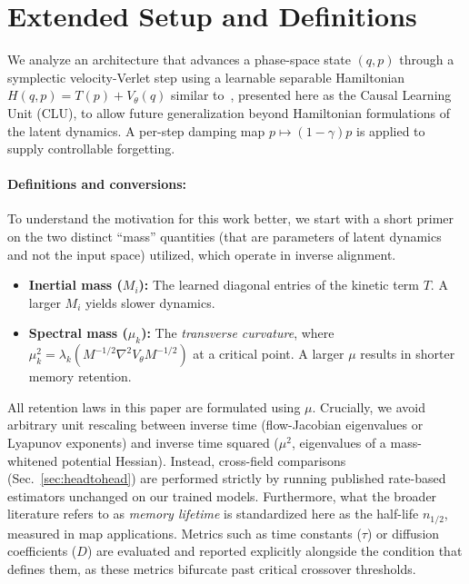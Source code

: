 \documentclass[mlabstract,onecolumn]{jmlr}
\begin{document}


\appendix

\section{Extended Setup and Definitions}
\label{app:defs}
We analyze an architecture that advances a phase-space state $(q,p)$ through a symplectic velocity-Verlet step using a learnable separable Hamiltonian $H(q,p)=T(p)+V_\theta(q)$ similar to~\citet{jawahar_chlu_2026}, presented here as the Causal Learning Unit (CLU), to allow future generalization beyond Hamiltonian formulations of the latent dynamics. A per-step damping map $p\mapsto(1-\gamma)p$ is applied to supply controllable forgetting.

\paragraph{Definitions and conversions:} To understand the motivation for this work better, we start with a short primer on the two distinct ``mass'' quantities (that are parameters of latent dynamics and not the input space) utilized, which operate in inverse alignment.
\begin{itemize}
    \item \textbf{Inertial mass ($M_i$):} The learned diagonal entries of the kinetic term $T$. A larger $M_i$ yields slower dynamics.
    \item \textbf{Spectral mass ($\mu_k$):} The \emph{transverse curvature}, where $\mu_k^2=\lambda_k(M^{-1/2}\nabla^2V_\theta M^{-1/2})$ at a critical point. A larger $\mu$ results in shorter memory retention.
\end{itemize}
All retention laws in this paper are formulated using $\mu$. Crucially, we avoid arbitrary unit rescaling between inverse time (flow-Jacobian eigenvalues or Lyapunov exponents) and inverse time squared ($\mu^2$, eigenvalues of a mass-whitened potential Hessian). Instead, cross-field comparisons (Sec.~\ref{sec:headtohead}) are performed strictly by running published rate-based estimators unchanged on our trained models. Furthermore, what the broader literature refers to as \emph{memory lifetime} is standardized here as the half-life $n_{1/2}$, measured in map applications. Metrics such as time constants ($\tau$) or diffusion coefficients ($D$) are evaluated and reported explicitly alongside the condition that defines them, as these metrics bifurcate past critical crossover thresholds.
\end{document}
